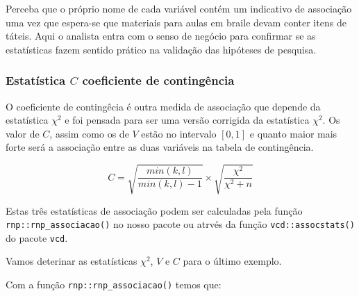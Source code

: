 \documentclass[11pt,]{style/krantz}
\makeatletter
\newenvironment{Shaded}{\begin{snugshade}}{\end{snugshade}}
\newcommand{\DataTypeTok}[1]{\textcolor[rgb]{0.13,0.29,0.53}{#1}}
\newcommand{\KeywordTok}[1]{\textcolor[rgb]{0.13,0.29,0.53}{\textbf{#1}}}
\newcommand{\NormalTok}[1]{#1}
\newcommand{\OperatorTok}[1]{\textcolor[rgb]{0.81,0.36,0.00}{\textbf{#1}}}
\newcommand{\StringTok}[1]{\textcolor[rgb]{0.31,0.60,0.02}{#1}}
\renewenvironment{quote}{\begin{VF}}{\end{VF}}
\newenvironment{kframe}{%
\medskip{}
\setlength{\fboxsep}{.8em}
 \def\at@end@of@kframe{}%
 \ifinner\ifhmode%
  \def\at@end@of@kframe{\end{minipage}}%
  \begin{minipage}{\columnwidth}%
 \fi\fi%
 \def\FrameCommand##1{\hskip\@totalleftmargin \hskip-\fboxsep
 \colorbox{shadecolor}{##1}\hskip-\fboxsep
     \hskip-\linewidth \hskip-\@totalleftmargin \hskip\columnwidth}%
 \MakeFramed {\advance\hsize-\width
   \@totalleftmargin\z@ \linewidth\hsize
   \@setminipage}}%
 {\par\unskip\endMakeFramed%
 \at@end@of@kframe}
\renewenvironment{Shaded}{\begin{kframe}}{\end{kframe}}
\theoremstyle{definition}
\theoremstyle{definition}
\theoremstyle{definition}
\theoremstyle{remark}
\let\BeginKnitrBlock\begin \let\EndKnitrBlock\end
\makeatother
\begin{document}
\begin{quote}
Perceba que o próprio nome de cada variável contém um indicativo de associação uma vez que espera-se que materiais para aulas em braile devam conter itens de táteis. Aqui o analista entra com o senso de negócio para confirmar se as estatísticas fazem sentido prático na validação das hipóteses de pesquisa.
\end{quote}

\hypertarget{estatistica-c-coeficiente-de-contingencia}{%
\subsubsection{\texorpdfstring{Estatística \(C\) coeficiente de contingência}{Estatística C coeficiente de contingência}}\label{estatistica-c-coeficiente-de-contingencia}}

O coeficiente de contingêcia é outra medida de associação que depende da estatística \(\chi^ 2\) e foi pensada para ser uma versão corrigida da estatística \(\chi^2\). Os valor de \(C\), assim como os de \(V\) estão no intervalo \([0,1]\) e quanto maior mais forte será a associação entre as duas variáveis na tabela de contingência.

\[C = \sqrt{\frac{min(k,l)}{min(k,l)-1}} \times \sqrt{\frac{\chi^2}{\chi^2 + n}} \]

Estas três estatísticas de associação podem ser calculadas pela função \texttt{rnp::rnp\_associacao()} no nosso pacote ou atrvés da função \texttt{vcd::assocstats()} do pacote \texttt{vcd}.

\BeginKnitrBlock{exercise}
\protect\hypertarget{exr:unnamed-chunk-99}{}{\label{exr:unnamed-chunk-99} }Vamos deterinar as estatísticas \(\chi^2\), \(V\) e \(C\) para o último exemplo.
\EndKnitrBlock{exercise}

\BeginKnitrBlock{solution}
\iffalse{} {Solução. } \fi{}Com a função \texttt{rnp::rnp\_associacao()} temos que:
\EndKnitrBlock{solution}

\begin{Shaded}
\end{Shaded}
\end{document}
